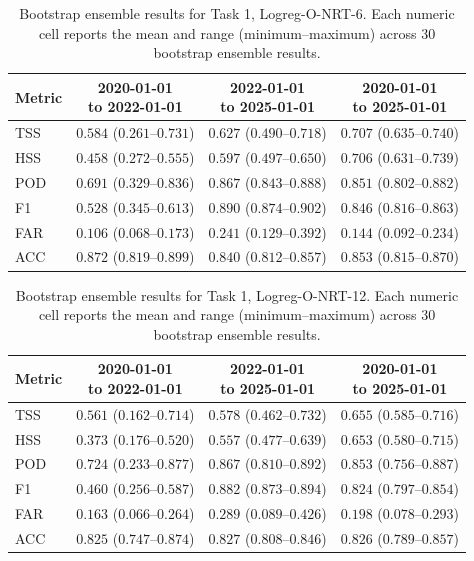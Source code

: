 \begin{table}[htbp]
\centering
\small
\caption{Bootstrap ensemble results for Task 1, Logreg-O-NRT-6. Each numeric cell reports the mean and range (minimum--maximum) across 30 bootstrap ensemble results.}
\label{tab:app-task1-logreg-o-nrt-6}
\begin{tabular}{lccc}
\toprule
Metric & \shortstack{2020-01-01\\to 2022-01-01} & \shortstack{2022-01-01\\to 2025-01-01} & \shortstack{2020-01-01\\to 2025-01-01} \\
\midrule
TSS & $0.584$ ($0.261$--$0.731$) & $0.627$ ($0.490$--$0.718$) & $0.707$ ($0.635$--$0.740$) \\
HSS & $0.458$ ($0.272$--$0.555$) & $0.597$ ($0.497$--$0.650$) & $0.706$ ($0.631$--$0.739$) \\
POD & $0.691$ ($0.329$--$0.836$) & $0.867$ ($0.843$--$0.888$) & $0.851$ ($0.802$--$0.882$) \\
F1 & $0.528$ ($0.345$--$0.613$) & $0.890$ ($0.874$--$0.902$) & $0.846$ ($0.816$--$0.863$) \\
FAR & $0.106$ ($0.068$--$0.173$) & $0.241$ ($0.129$--$0.392$) & $0.144$ ($0.092$--$0.234$) \\
ACC & $0.872$ ($0.819$--$0.899$) & $0.840$ ($0.812$--$0.857$) & $0.853$ ($0.815$--$0.870$) \\
\bottomrule
\end{tabular}
\end{table}
\clearpage

\begin{table}[htbp]
\centering
\small
\caption{Bootstrap ensemble results for Task 1, Logreg-O-NRT-12. Each numeric cell reports the mean and range (minimum--maximum) across 30 bootstrap ensemble results.}
\label{tab:app-task1-logreg-o-nrt-12}
\begin{tabular}{lccc}
\toprule
Metric & \shortstack{2020-01-01\\to 2022-01-01} & \shortstack{2022-01-01\\to 2025-01-01} & \shortstack{2020-01-01\\to 2025-01-01} \\
\midrule
TSS & $0.561$ ($0.162$--$0.714$) & $0.578$ ($0.462$--$0.732$) & $0.655$ ($0.585$--$0.716$) \\
HSS & $0.373$ ($0.176$--$0.520$) & $0.557$ ($0.477$--$0.639$) & $0.653$ ($0.580$--$0.715$) \\
POD & $0.724$ ($0.233$--$0.877$) & $0.867$ ($0.810$--$0.892$) & $0.853$ ($0.756$--$0.887$) \\
F1 & $0.460$ ($0.256$--$0.587$) & $0.882$ ($0.873$--$0.894$) & $0.824$ ($0.797$--$0.854$) \\
FAR & $0.163$ ($0.066$--$0.264$) & $0.289$ ($0.089$--$0.426$) & $0.198$ ($0.078$--$0.293$) \\
ACC & $0.825$ ($0.747$--$0.874$) & $0.827$ ($0.808$--$0.846$) & $0.826$ ($0.789$--$0.857$) \\
\bottomrule
\end{tabular}
\end{table}
\clearpage

